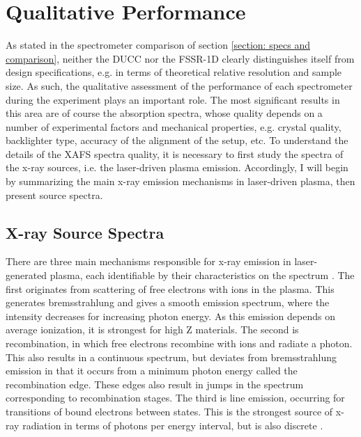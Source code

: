 \section{Qualitative Performance}
\label{section: qualitative performance}

As stated in the spectrometer comparison of section \ref{section: specs and comparison}, neither the DUCC nor the FSSR-1D clearly distinguishes itself from design specifications, e.g. in terms of theoretical relative resolution and sample size. As such, the qualitative assessment of the performance of each spectrometer during the experiment plays an important role. The most significant results in this area are of course the absorption spectra, whose quality depends on a number of experimental factors and mechanical properties, e.g. crystal quality, backlighter type, accuracy of the alignment of the setup, etc. To understand the details of the XAFS spectra quality, it is necessary to first study the spectra of the x-ray sources, i.e. the laser-driven plasma emission. Accordingly, I will begin by summarizing the main x-ray emission mechanisms in laser-driven plasma, then present source spectra.


\subsection{X-ray Source Spectra}

There are three main mechanisms responsible for
x-ray emission in laser-generated plasma, each identifiable by their characteristics on the spectrum \citep{riley2021warm, 
	giulietti1998x}. The first originates from scattering of free electrons with 
ions in the plasma. This generates bremsstrahlung and 
gives a smooth emission spectrum, where the intensity
decreases for increasing photon energy. As this 
emission depends on average ionization, it is 
strongest for high Z materials. The second is 
recombination, in which free electrons recombine with 
ions and radiate a photon. This also results in a 
continuous spectrum, but deviates from bremsstrahlung emission in that it occurs from a minimum photon energy 
called the recombination edge. These edges also 
result in jumps in the spectrum corresponding to 
recombination stages. The third is line emission, 
occurring for transitions of bound electrons between 
states. This is the strongest source of x-ray 
radiation in terms of photons per energy interval, but is also discrete \citep{giulietti1998x}. 

